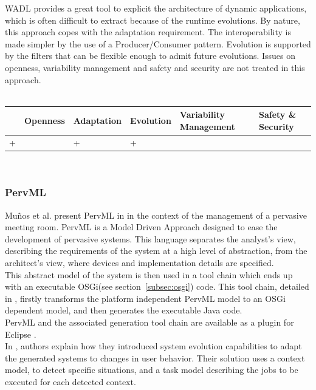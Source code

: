 WADL provides a great tool to explicit the architecture of dynamic applications, which is often difficult to extract because of the runtime evolutions. By nature, this approach copes with the adaptation requirement. The interoperability is made simpler by the use of a Producer/Consumer pattern. Evolution is supported by the filters that can be flexible enough to admit future evolutions. Issues on openness, variability management and safety and security are not treated in this approach.\\
\\
\begin{tabular}{ >{\centering}m{}| >{\centering}m{} >{\centering}m{}| >{\centering}m{} >{\centering}m{}| >{\centering\arraybackslash}m{}}
{\tiny Interoperability} & {\tiny Openness} & {\tiny Adaptation} & {\tiny Evolution} & {\tiny Variability Management} & {\tiny Safety \& Security}\\
 \hline
 + &  & + & + &  & \\ 
  \hline
\end{tabular}\\


\subsubsection{PervML}
Mu\~nos et al. present PervML in \cite{Munoz:2006a}\cite{Munoz:2006b} in the context of the management of a pervasive meeting room. PervML is a Model Driven Approach designed to ease the development of pervasive systems. This language separates the analyst's view, describing the requirements of the system at a high level of abstraction, from the architect's view, where devices and implementation details are specified.\\
This abstract model of the system is then used in a tool chain which ends up with an executable OSGi(see section~\ref{subsec:osgi}) code. This tool chain, detailed in \cite{Munoz:2006}, firstly transforms the platform independent PervML model to an OSGi dependent model, and then generates the executable Java code.\\
PervML and the associated generation tool chain are available as a plugin for Eclipse \cite{Cetina:2007}.\\
In \cite{Serral:2010a}, authors explain how they introduced system evolution capabilities to adapt the generated systems to changes in user behavior. Their solution uses a context model, to detect specific situations, and a task model describing the jobs to be executed for each detected context.\\

